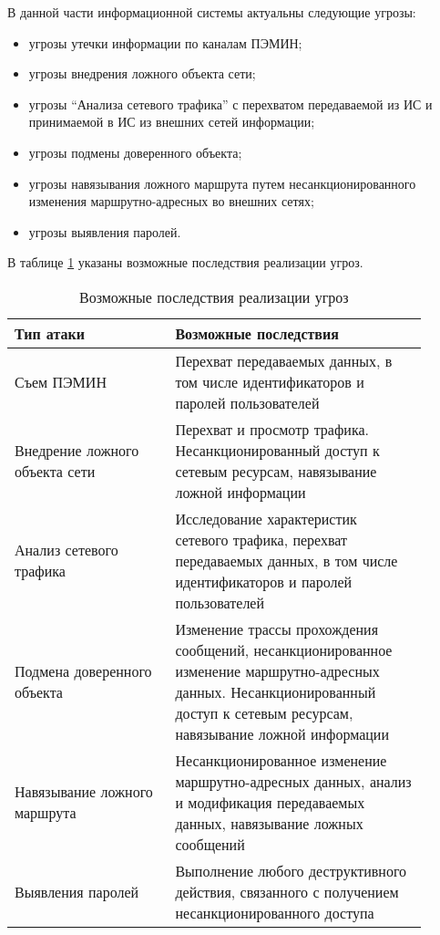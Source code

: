 В данной части информационной системы актуальны следующие угрозы:

\begin{itemize}
 \item угрозы утечки информации по каналам ПЭМИН;
 \item угрозы внедрения ложного объекта сети;
 \item угрозы ``Анализа сетевого трафика'' с перехватом передаваемой из ИС и принимаемой в ИС из внешних сетей информации;
 \item угрозы подмены доверенного объекта;
 \item угрозы навязывания ложного маршрута путем несанкционированного изменения маршрутно-адресных во внешних сетях;
 \item угрозы выявления паролей.
\end{itemize}

В таблице \ref{tab:threats} указаны возможные последствия реализации угроз.

\begin{table}[!ht]
 \caption{Возможные последствия реализации угроз} 
 \label{tab:threats}
  \begin{tabular}{|p{0.35\linewidth}|p{0.55\linewidth}|}
   \hline
   Тип атаки & Возможные последствия \\ 
   \hline
   Съем ПЭМИН & Перехват   передаваемых   данных,  в том числе идентификаторов и паролей пользователей \\
   \hline
   Внедрение ложного объекта сети & Перехват и просмотр трафика. Несанкционированный доступ  к  сетевым  ресурсам, навязывание ложной информации \\
   \hline
   Анализ сетевого трафика & Исследование   характеристик   сетевого   трафика, перехват   передаваемых   данных,  в том числе идентификаторов и паролей пользователей\\
   \hline
   Подмена доверенного объекта & Изменение    трассы    прохождения    сообщений, несанкционированное    изменение   маршрутно-адресных  данных.  Несанкционированный  доступ  к сетевым ресурсам, навязывание ложной информации\\
   \hline
   Навязывание ложного маршрута & Несанкционированное    изменение    маршрутно-адресных    данных,    анализ    и    модификация передаваемых    данных,   навязывание    ложных сообщений\\
   \hline
   Выявления паролей & Выполнение   любого   деструктивного   действия, связанного  с  получением  несанкционированного доступа\\
   \hline
  \end{tabular}
\end{table}
